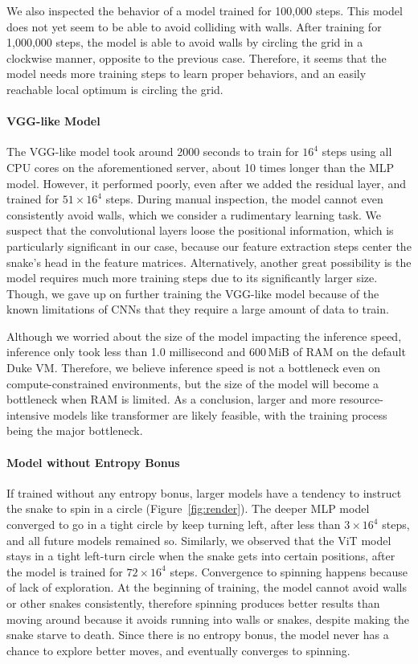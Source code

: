 \documentclass[conference]{IEEEtran}
\begin{document}
We also inspected the behavior of a model trained for 100,000 steps.
This model does not yet seem to be able to avoid colliding with walls.
After training for 1,000,000 steps,
the model is able to avoid walls by circling the grid in a clockwise manner,
opposite to the previous case. Therefore,
it seems that the model needs more training steps to learn proper behaviors,
and an easily reachable local optimum is circling the grid.

\paragraph{VGG-like Model}
The VGG-like model took around 2000 seconds to train for $16^4$ steps using all
CPU cores on the aforementioned server,
about 10 times longer than the MLP model. However, it performed poorly,
even after we added the residual layer, and trained for $51 \times 16^4$ steps.
During manual inspection, the model cannot even consistently avoid walls,
which we consider a rudimentary learning task.
We suspect that the convolutional layers loose the positional information,
which is particularly significant in our case,
because our feature extraction steps center the snake's head in the feature
matrices. Alternatively,
another great possibility is the model requires much more training steps due to
its significantly larger size. Though,
we gave up on further training the VGG-like model because of the known
limitations of CNNs that they require a large amount of data to train.

Although we worried about the size of the model impacting the inference speed,
inference only took less than 1.0 millisecond and 600\,MiB of RAM on the default
Duke VM. Therefore,
we believe inference speed is not a bottleneck even on compute-constrained
environments,
but the size of the model will become a bottleneck when RAM is limited.
As a conclusion,
larger and more resource-intensive models like transformer are likely feasible,
with the training process being the major bottleneck.

\paragraph{Model without Entropy Bonus}
If trained without any entropy bonus,
larger models have a tendency to instruct the snake to spin in a circle
(Figure~\ref{fig:render}).
The deeper MLP model converged to go in a tight circle by keep turning left,
after less than $3\times 16^4$ steps, and all future models remained so.
Similarly,
we observed that the ViT model stays in a tight left-turn circle when the
snake gets into certain positions,
after the model is trained for $72\times 16^4$ steps.
Convergence to spinning happens because of lack of exploration.
At the beginning of training,
the model cannot avoid walls or other snakes consistently,
therefore spinning produces better results than moving around because it avoids
running into walls or snakes, despite making the snake starve to death.
Since there is no entropy bonus,
the model never has a chance to explore better moves,
and eventually converges to spinning.
\end{document}
